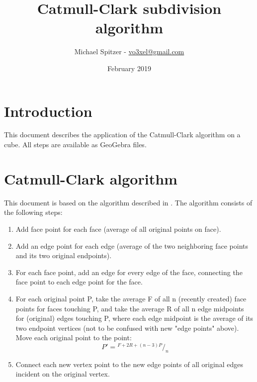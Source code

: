 \documentclass{article}
\title{Catmull-Clark subdivision algorithm}
\author{Michael Spitzer - \href{mailto:vo3xel@gmail.com}{vo3xel@gmail.com}}
\date{February 2019}
\newcommand*\rfrac[2]{{}^{#1}\!/_{#2}}%
\begin{document}
\maketitle

\section{Introduction}
This document describes the application of the Catmull-Clark algorithm on a cube. All steps are available as GeoGebra files.

\section{Catmull-Clark algorithm}
This document is based on the algorithm described in \cite{catmull1978recursively}. The algorithm consists of the following steps:
    \begin{enumerate}
      \item Add face point for each face (average of all original points on face).
      \item Add an edge point for each edge (average of the two neighboring face points and its two original endpoints).
      \item For each face point, add an edge for every edge of the face, connecting the face point to each edge point for the face.
      \item For each original point P, take the average F of all n (recently created) face points for faces touching P, and take the average R of all n edge midpoints for (original) edges touching P, where each edge midpoint is the average of its two endpoint vertices (not to be confused with new "edge points" above). Move each original point to the point:\[P'=\rfrac{F+2R+(n-3)P}{n}\]
      \item Connect each new vertex point to the new edge points of all original edges incident on the original vertex.
    \end{enumerate}
\end{document}
